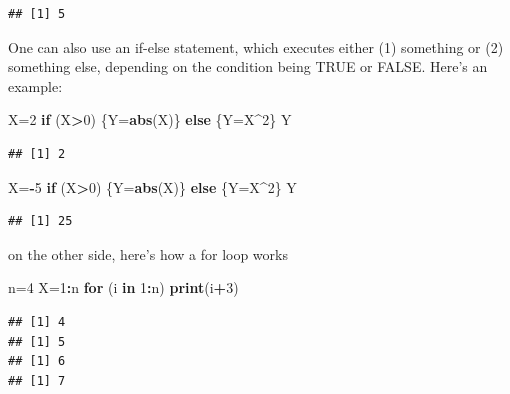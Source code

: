 \documentclass[
]{article}
\newenvironment{Shaded}{\begin{snugshade}}{\end{snugshade}}
\newcommand{\ControlFlowTok}[1]{\textcolor[rgb]{0.13,0.29,0.53}{\textbf{#1}}}
\newcommand{\DecValTok}[1]{\textcolor[rgb]{0.00,0.00,0.81}{#1}}
\newcommand{\FunctionTok}[1]{\textcolor[rgb]{0.13,0.29,0.53}{\textbf{#1}}}
\newcommand{\NormalTok}[1]{#1}
\newcommand{\OtherTok}[1]{\textcolor[rgb]{0.56,0.35,0.01}{#1}}
\newcommand{\SpecialCharTok}[1]{\textcolor[rgb]{0.81,0.36,0.00}{\textbf{#1}}}
\begin{document}
\begin{verbatim}
## [1] 5
\end{verbatim}

One can also use an if-else statement, which executes either (1)
something or (2) something else, depending on the condition being TRUE
or FALSE. Here's an example:

\begin{Shaded}
\begin{Highlighting}[]
\NormalTok{X}\OtherTok{=}\DecValTok{2}
\ControlFlowTok{if}\NormalTok{ (X}\SpecialCharTok{\textgreater{}}\DecValTok{0}\NormalTok{)}
\NormalTok{  \{Y}\OtherTok{=}\FunctionTok{abs}\NormalTok{(X)\} }\ControlFlowTok{else} 
\NormalTok{  \{Y}\OtherTok{=}\NormalTok{X}\SpecialCharTok{\^{}}\DecValTok{2}\NormalTok{\}}
\NormalTok{Y}
\end{Highlighting}
\end{Shaded}

\begin{verbatim}
## [1] 2
\end{verbatim}

\begin{Shaded}
\begin{Highlighting}[]
\NormalTok{X}\OtherTok{=}\SpecialCharTok{{-}}\DecValTok{5}
\ControlFlowTok{if}\NormalTok{ (X}\SpecialCharTok{\textgreater{}}\DecValTok{0}\NormalTok{)}
\NormalTok{  \{Y}\OtherTok{=}\FunctionTok{abs}\NormalTok{(X)\} }\ControlFlowTok{else} 
\NormalTok{  \{Y}\OtherTok{=}\NormalTok{X}\SpecialCharTok{\^{}}\DecValTok{2}\NormalTok{\}}
\NormalTok{Y}
\end{Highlighting}
\end{Shaded}

\begin{verbatim}
## [1] 25
\end{verbatim}

on the other side, here's how a for loop works

\begin{Shaded}
\begin{Highlighting}[]
\NormalTok{n}\OtherTok{=}\DecValTok{4}
\NormalTok{X}\OtherTok{=}\DecValTok{1}\SpecialCharTok{:}\NormalTok{n}
\ControlFlowTok{for}\NormalTok{ (i }\ControlFlowTok{in} \DecValTok{1}\SpecialCharTok{:}\NormalTok{n) }\FunctionTok{print}\NormalTok{(i}\SpecialCharTok{+}\DecValTok{3}\NormalTok{)}
\end{Highlighting}
\end{Shaded}

\begin{verbatim}
## [1] 4
## [1] 5
## [1] 6
## [1] 7
\end{verbatim}
\end{document}
